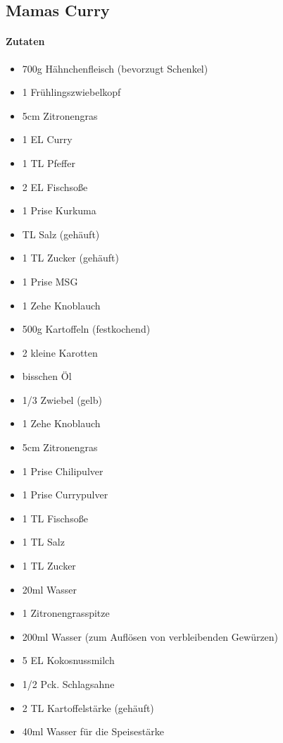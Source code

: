 \newpage
\subsection{Mamas Curry}
\paragraph{Zutaten}
\begin{itemize}[noitemsep]
	\item 700g Hähnchenfleisch (bevorzugt Schenkel)
	\item 1 Frühlingszwiebelkopf 
	\item 5cm Zitronengras
	\item 1 EL Curry
	\item 1 TL Pfeffer
	\item 2 EL Fischsoße
	\item 1 Prise Kurkuma
	\item TL Salz (gehäuft)
	\item 1 TL Zucker (gehäuft)
	\item 1 Prise MSG
	\item 1 Zehe Knoblauch
	\vspace{0.5cm}
	\item 500g Kartoffeln (festkochend)
	\item 2 kleine Karotten
	\item bisschen Öl
	\item 1/3 Zwiebel (gelb)
	\item 1 Zehe Knoblauch
	\item 5cm Zitronengras
	\item 1 Prise Chilipulver
	\item 1 Prise Currypulver
	\item 1 TL Fischsoße
	\item 1 TL Salz
	\item 1 TL Zucker
	\item 20ml Wasser
	\item 1 Zitronengrasspitze
	\item 200ml Wasser (zum Auflösen von verbleibenden Gewürzen)
	\item 5 EL Kokosnussmilch
	\item 1/2 Pck. Schlagsahne
	\item 2 TL Kartoffelstärke (gehäuft)
	\item 40ml Wasser für die Speisestärke
\end{itemize}
